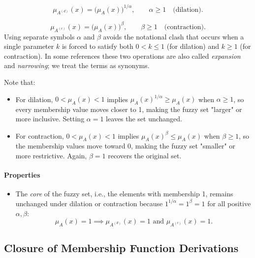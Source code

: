 \begin{equation}
\mu_{A^{(d)}}(x) = \big(\mu_A(x)\big)^{1/\alpha}, \qquad \alpha \geq 1 \quad \text{(dilation).}
\end{equation}\label{eq:dilation}

\begin{equation}
\mu_{A^{(c)}}(x) = \big(\mu_A(x)\big)^{\beta}, \qquad \beta \geq 1 \quad \text{(contraction).}
\end{equation}\label{eq:contraction}
Using separate symbols \(\alpha\) and \(\beta\) avoids the notational clash that occurs when a single parameter \(k\) is forced to satisfy both \(0<k\leq 1\) (for dilation) and \(k \geq 1\) (for contraction). In some references these two operations are also called \emph{expansion} and \emph{narrowing}; we treat the terms as synonyms.

Note that:
\begin{itemize}
    \item For dilation, \(0 < \mu_A(x) < 1\) implies \(\mu_A(x)^{1/\alpha} \geq \mu_A(x)\) when \(\alpha \geq 1\), so every membership value moves closer to 1, making the fuzzy set "larger" or more inclusive. Setting \(\alpha=1\) leaves the set unchanged.
    \item For contraction, \(0 < \mu_A(x) < 1\) implies \(\mu_A(x)^{\beta} \leq \mu_A(x)\) when \(\beta \geq 1\), so the membership values move toward 0, making the fuzzy set "smaller" or more restrictive. Again, \(\beta=1\) recovers the original set.
\end{itemize}

\paragraph{Properties}

\begin{itemize}
    \item The \emph{core} of the fuzzy set, i.e., the elements with membership 1, remains unchanged under dilation or contraction because \(1^{1/\alpha} = 1^{\beta} = 1\) for all positive \(\alpha,\beta\):
    \[
    \mu_A(x) = 1 \implies \mu_{A^{(d)}}(x) = 1 \text{ and } \mu_{A^{(c)}}(x) = 1.
    \]
\end{itemize}

\subsection{Closure of Membership Function Derivations}
\label{sec:fuzzysets_closure_of_membership_function_derivations}

